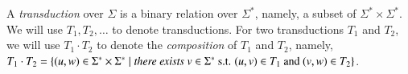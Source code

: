 
A \emph{transduction} over $\Sigma$ is a binary relation over $\Sigma^*$, namely, a subset of $\Sigma^* \times \Sigma^*$. We will use $T_1, T_2,\ldots$ to denote transductions. For two transductions $T_1$ and $T_2$, we will use $T_1 \cdot T_2$ to denote the \emph{composition} of $T_1$ and $T_2$, namely, $T_1 \cdot T_2 = \{(u, w) \in \Sigma^* \times \Sigma^* \mid \emph{there exists } v \in \Sigma^* \mbox{ s.t. } (u,v) \in T_1 \mbox{ and } (v,w) \in T_2\}$.



